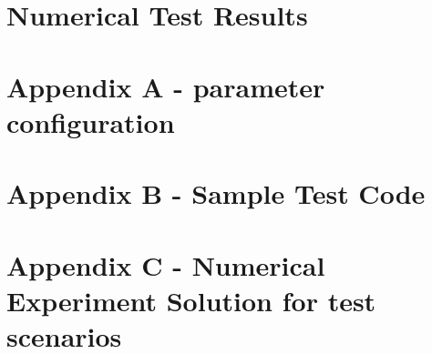 \documentclass[11pt,letterpaper]{article}
\begin{document}
\section{Numerical Test Results}

\pagebreak 


\pagebreak
\section*{Appendix A - parameter configuration}

\section*{Appendix B - Sample Test Code }

\section*{Appendix C - Numerical Experiment Solution for test scenarios}
\end{document}
